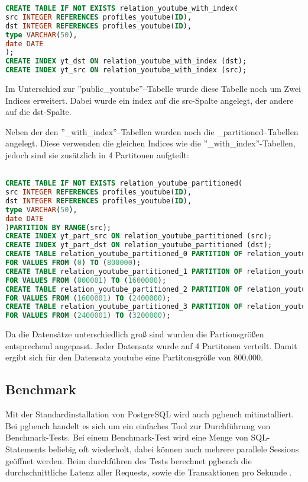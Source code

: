 \begin{lstlisting}[language=SQL,caption = Tabelle mit Index anlegen,frame=single, label={2.tabelleIndex.listing} ]
CREATE TABLE IF NOT EXISTS relation_youtube_with_index(
src INTEGER REFERENCES profiles_youtube(ID),
dst INTEGER REFERENCES profiles_youtube(ID),
type VARCHAR(50),
date DATE
);
CREATE INDEX yt_dst ON relation_youtube_with_index (dst);
CREATE INDEX yt_src ON relation_youtube_with_index (src);
\end{lstlisting}

Im Unterschied zur ''public\_youtube''--Tabelle wurde diese Tabelle noch um Zwei Indices erweitert. Dabei wurde ein index auf die src-Spalte angelegt, der andere auf die dst-Spalte.


Neben der den ''\_with\_index''--Tabellen wurden noch die \_partitioned--Tabellen angelegt. Diese verwenden die gleichen Indices wie die ''\_with\_index''-Tabellen, jedoch sind sie zusätzlich in 4 Partitonen aufgteilt:

\begin{lstlisting}[language=SQL,caption = Partitonierte Tabelle mit Indices anlegen,frame=single, label={2.tabelleIndex.listing} ]

CREATE TABLE IF NOT EXISTS relation_youtube_partitioned(
src INTEGER REFERENCES profiles_youtube(ID),
dst INTEGER REFERENCES profiles_youtube(ID),
type VARCHAR(50),
date DATE
)PARTITION BY RANGE(src);
CREATE INDEX yt_part_src ON relation_youtube_partitioned (src);
CREATE INDEX yt_part_dst ON relation_youtube_partitioned (dst);
CREATE TABLE relation_youtube_partitioned_0 PARTITION OF relation_youtube_partitioned
FOR VALUES FROM (0) TO (800000);
CREATE TABLE relation_youtube_partitioned_1 PARTITION OF relation_youtube_partitioned
FOR VALUES FROM (800001) TO (1600000);
CREATE TABLE relation_youtube_partitioned_2 PARTITION OF relation_youtube_partitioned
FOR VALUES FROM (1600001) TO (2400000);
CREATE TABLE relation_youtube_partitioned_3 PARTITION OF relation_youtube_partitioned
FOR VALUES FROM (2400001) TO (3200000);
\end{lstlisting}

Da die Datensätze unterschiedlich groß sind wurden die Partionsgrößen entsprechend angepasst. Jeder Datensatz wurde auf 4 Partitonen verteilt. Damit ergibt sich für den Datensatz youtube eine Partitonsgröße von 800.000.



\subsection{Benchmark}
Mit der Standardinstallation von PostgreSQL wird auch pgbench mitinstalliert. Bei pgbench handelt es sich um ein einfaches Tool zur Durchführung von Benchmark-Tests. Bei einem Benchmark-Test wird eine Menge von \ac{SQL}-Statements beliebig oft wiederholt, dabei können auch mehrere parallele Sessions geöffnet werden. Beim durchführen des Tests berechnet pgbench die durchschnittliche Latenz aller Requests, sowie die Transaktionen pro Sekunde \cite{postgres2018}.
